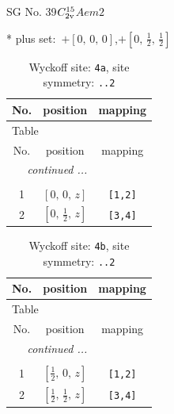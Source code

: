 \documentclass[fleqn,8pt]{jsarticle}
\begin{document}
\setcounter{MaxMatrixCols}{32}

\renewcommand{\tablename}{Table~}
\renewcommand{\figurename}{Figure~}
\begin{center}
\LARGE
SG No. 39\quad$C_{\rm 2v}^{15}$\quad$Aem2$\quad[ orthorhombic ]
\end{center}
* plus set:\,\,\,$+\left[ 0,\, 0,\, 0 \right]$,\quad $+\left[ 0,\, \frac{1}{2},\, \frac{1}{2} \right]$
\renewcommand{\arraystretch}{1.2}
\begin{longtable}{ccc}
\caption{Wyckoff site: {\tt 4a}, site symmetry: {\tt ..2}}
 \\
 \hline \hline
No. & position & mapping \\ \hline \endfirsthead

\multicolumn{2}{l}{\tablename\ \thetable{}} \\
 \hline \hline
No. & position & mapping \\ \hline \endhead

 \hline \hline
\multicolumn{2}{r}{\footnotesize\it continued ...} \\ \endfoot

 \hline \hline
\multicolumn{2}{r}{} \\ \endlastfoot

1 & $\left[ 0,\, 0,\, z \right]$ & {\tt [1,2]} \\ \hline
2 & $\left[ 0,\, \frac{1}{2},\, z \right]$ & {\tt [3,4]} \\
\end{longtable}
\renewcommand{\arraystretch}{1.2}
\begin{longtable}{ccc}
\caption{Wyckoff site: {\tt 4b}, site symmetry: {\tt ..2}}
 \\
 \hline \hline
No. & position & mapping \\ \hline \endfirsthead

\multicolumn{2}{l}{\tablename\ \thetable{}} \\
 \hline \hline
No. & position & mapping \\ \hline \endhead

 \hline \hline
\multicolumn{2}{r}{\footnotesize\it continued ...} \\ \endfoot

 \hline \hline
\multicolumn{2}{r}{} \\ \endlastfoot

1 & $\left[ \frac{1}{2},\, 0,\, z \right]$ & {\tt [1,2]} \\ \hline
2 & $\left[ \frac{1}{2},\, \frac{1}{2},\, z \right]$ & {\tt [3,4]} \\
\end{longtable}
\end{document}

